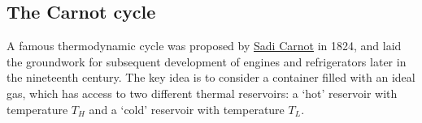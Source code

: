 \subsection{The Carnot cycle}
A famous thermodynamic cycle was proposed by \href{https://en.wikipedia.org/wiki/Nicolas_Léonard_Sadi_Carnot}{Sadi Carnot} in 1824, and laid the groundwork for subsequent development of engines and refrigerators later in the nineteenth century.
The key idea is to consider a container filled with an ideal gas, which has access to two different thermal reservoirs: a `hot' reservoir with temperature $T_H$ and a `cold' reservoir with temperature $T_L$.

